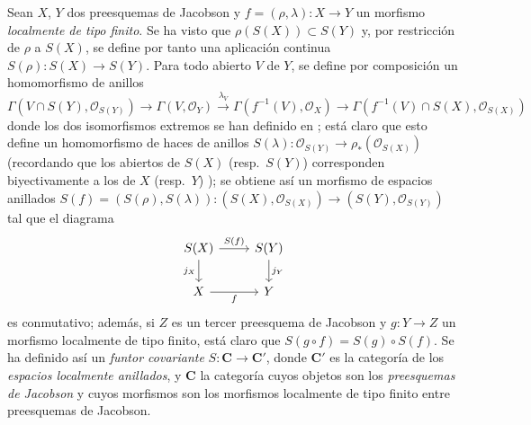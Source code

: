 \begin{env}[10.9.2]
\label{IV.10.9.2}
Sean $X$, $Y$ dos preesquemas de Jacobson y $f=(\rho,\lambda):X\to Y$ un morfismo \emph{localmente de tipo finito}.
Se ha visto  que $\rho(S(X))\subset S(Y)$ y, por restricción de $\rho$ a $S(X)$, se define por tanto una aplicación continua $S(\rho):S(X)\to S(Y)$.
Para todo abierto $V$ de $Y$, se define por composición un homomorfismo de anillos
\[
  \Gamma(V\cap S(Y),\mathcal O_{S(Y)})\longrightarrow
  \Gamma(V,\mathcal O_Y)\xrightarrow{\lambda_V}
  \Gamma(f^{-1}(V),\mathcal O_X)\longrightarrow
  \Gamma(f^{-1}(V)\cap S(X),\mathcal O_{S(X)})
\]
donde los dos isomorfismos extremos se han definido en ; está claro que esto define un homomorfismo de haces de anillos $S(\lambda):\mathcal O_{S(Y)}\to\rho_*(\mathcal O_{S(X)})$ (recordando que los abiertos de $S(X)$ (resp.\ $S(Y)$) corresponden biyectivamente a los de $X$ (resp.\ $Y$) ); se obtiene así un morfismo de espacios anillados $S(f)=(S(\rho),S(\lambda)):(S(X),\mathcal O_{S(X)})\longrightarrow
  (S(Y),\mathcal O_{S(Y)})$ tal que el diagrama
\[
\begin{tikzcd}
S(X) \ar[r,"S(f)"] \ar[d,"j_X"'] & S(Y) \ar[d,"j_Y"] \\
X \ar[r,"f"'] & Y
\end{tikzcd}
\]
es conmutativo; además, si $Z$ es un tercer preesquema de Jacobson y $g:Y\to Z$ un morfismo localmente de tipo finito, está claro que $S(g\circ f)=S(g)\circ S(f)$.
Se ha definido así un \emph{funtor covariante} $S:\boldsymbol{C}\to\boldsymbol{C}'$, donde $\boldsymbol{C}'$ es la categoría de los \emph{espacios localmente anillados}, y $\boldsymbol{C}$ la categoría cuyos objetos son los \emph{preesquemas de Jacobson} y cuyos morfismos son los morfismos localmente de tipo finito entre preesquemas de Jacobson.
\end{env}

